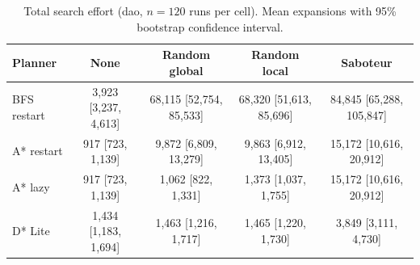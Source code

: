 \begin{table}[!t]
\centering
\footnotesize
\caption{Total search effort (dao, $n=120$ runs per cell). Mean expansions with 95\% bootstrap confidence interval.}
\label{tab:total-dao}
\begin{tabular}{lcccc}
\toprule
Planner & None & Random global & Random local & Saboteur \\
\midrule
BFS restart & 3,923 [3,237, 4,613] & 68,115 [52,754, 85,533] & 68,320 [51,613, 85,696] & 84,845 [65,288, 105,847] \\
A* restart & 917 [723, 1,139] & 9,872 [6,809, 13,279] & 9,863 [6,912, 13,405] & 15,172 [10,616, 20,912] \\
A* lazy & 917 [723, 1,139] & 1,062 [822, 1,331] & 1,373 [1,037, 1,755] & 15,172 [10,616, 20,912] \\
D* Lite & 1,434 [1,183, 1,694] & 1,463 [1,216, 1,717] & 1,465 [1,220, 1,730] & 3,849 [3,111, 4,730] \\
\bottomrule
\end{tabular}
\end{table}
